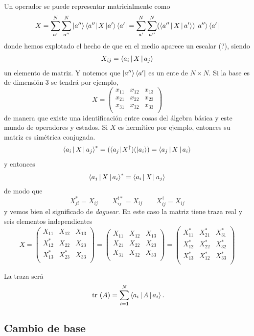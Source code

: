 \documentclass[10pt,oneside]{CBFT_book}
\begin{document}
Un operador se puede representar matricialmente como 
\[
	X = \sum_{a'}^N  \sum_{a''}^N \Ket{a''} \Bra{a''} X \Ket{a'} \Bra{a'} =  
	\sum_{a'}^N  \sum_{a''}^N ( \Braket{a''|X|a'} ) \Ket{a''} \Bra{a'}
\]
donde hemos explotado el hecho de que en el medio aparece un escalar (?), siendo 
\[
	X_{ij} = \Braket{a_i|X|a_j}
\]
un elemento de matriz. Y notemos que $\Ket{a''} \Bra{a'}$ es un ente de $N\times N$.
Si la base es de dimensión 3 se tendrá por ejemplo,
\[
	X = \begin{pmatrix}
	 x_{11} & x_{12} & x_{13} \\
	 x_{21} & x_{22} & x_{23} \\
	 x_{31} & x_{32} & x_{33} \\
	\end{pmatrix}
\]
de manera que existe una identificación entre cosas del álgebra básica y este mundo
de operadores y estados.
Si $X$ es hermítico por ejemplo, entonces su matriz es simétrica conjugada.
\[
	\Braket{a_i|X|a_j}^* = (\Bra{a_j}X^\dagger)(\Ket{a_i}) = \Braket{a_j|X|a_i}
\]
y entonces 
\[
	\Braket{a_j|X|a_i}^* = \Braket{a_i|X|a_j}
\]
de modo que 
\[
	X_{ji}^* = X_{ij} \qquad X_{ij}^{t*} = X_{ij} \qquad X_{ij}^\dagger=X_{ij}
\]
y vemos bien el significado de {\it daguear}. En este caso la matriz tiene traza real
y seis elementos independientes
\[
	X = \begin{pmatrix}
	  X_{11} & X_{12} & X_{13} \\
	  X_{12}^* & X_{22} & X_{23} \\
	  X_{13}^* & X_{23}^* & X_{33} \\
	\end{pmatrix} =
	\begin{pmatrix}
	  X_{11} & X_{12} & X_{13} \\
	  X_{21} & X_{22} & X_{23} \\
	  X_{31} & X_{32} & X_{33} \\
	\end{pmatrix} =
	\begin{pmatrix}
	  X_{11}^* & X_{21}^* & X_{31}^* \\
	  X_{12}^* & X_{22}^* & X_{32}^* \\
	  X_{13}^* & X_{12}^* & X_{33}^* \\
	\end{pmatrix}
\]

La traza será
\[
	\text{ tr }(A) = \sum_{i=1}^N \Braket{ a_i | A | a_i }.
\]


\subsection{Cambio de base}
\end{document}
